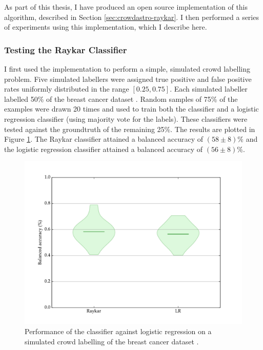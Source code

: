         As part of this thesis, I have produced an open source implementation of
        this algorithm, described in Section \ref{sec:crowdastro-raykar}. I then
        performed a series of experiments using this implementation, which I
        describe here.

        \subsubsection{Testing the Raykar Classifier}

            I first used the implementation to perform a simple, simulated crowd
            labelling problem. Five simulated labellers were assigned true
            positive and false positive rates uniformly distributed in the range
            $[0.25, 0.75]$. Each simulated labeller labelled 50\% of the breast
            cancer dataset . Random samples of 75\% of the
            examples were drawn 20 times and used to train both the
            \citeauthor{raykar10} classifier and a logistic regression
            classifier (using majority vote for the labels). These classifiers
            were tested against the groundtruth of the remaining 25\%. The
            results are plotted in Figure \ref{fig:raykar}. The Raykar
            classifier attained a balanced accuracy of $(58 \pm 8)\%$ and the
            logistic regression classifier attained a balanced accuracy of $(56
            \pm 8)\%$.

            \begin{figure}[!ht]
                \centering
                \includegraphics[width=\textwidth]
                    {images/experiments/raykar.pdf}
                \caption{Performance of the \citeauthor{raykar10} classifier
                    against logistic regression on a simulated crowd labelling
                    of the breast cancer dataset \citep{wolberg90}.}
                \label{fig:raykar}
            \end{figure}

